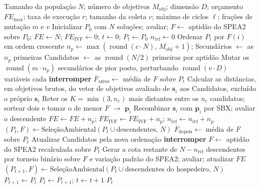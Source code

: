 \begin{algorithm}[!htbp]
\caption[Pseudocódigo do IVF/SPEA2]{IVF/SPEA2 com a mesma quantidade de avaliações das funções objetivo que o hospedeiro}
\label{alg:ivf_spea2}
\small
\begin{algorithmic}[1]
\Require Tamanho da população $N$; número de objetivos $M_{\text{obj}}$; dimensão $D$; orçamento $FE_{\max}$; taxa de execução $r$; tamanho da coleta $c$; máximo de ciclos $\ell$; frações de mutação $m$ e $v$
\State Inicializar $P_0$ com $N$ soluções; avaliar; $F \gets$ aptidão do SPEA2 sobre $P_0$; $FE \gets N$; $FE_{\text{IVF}} \gets 0$; $t \gets 0$; $P_t \gets P_0$
  \State $n_{\text{ivf}} \gets 0$
   
    \State Ordenar $P_t$ por $F(i)$ em ordem crescente 
    \State $n_p \gets \max(\operatorname{round}(c \cdot N),\, M_{\text{obj}} + 1)$; Secundários $\gets$ as $n_p$ primeiras
    \State Candidatos $\gets$ as $\operatorname{round}(N/2)$ primeiras por aptidão 
    \State Mutar os $\operatorname{round}(m \cdot n_p)$ secundários de pior posto, perturbando $\operatorname{round}(v \cdot D)$ variáveis cada 
       \textbf{interromper} 
      \EndIf
      \State $\overline{F}_{\text{antes}} \gets$ média de $F$ sobre $P_t$
        \State Calcular as distâncias, em objetivos brutos, do vetor de objetivos avaliado de $\mathbf{s}_i$ aos Candidatos, excluído o próprio $\mathbf{s}_i$
        \State Reter os $K = \min(3, n_c)$ mais distantes entre os $n_c$ candidatos; sortear dois e tomar o de menor $F$ $\to$ $\mathbf{p}_i$
        \State Recombinar $\mathbf{s}_i$ com $\mathbf{p}_i$ por SBX; avaliar o descendente
      \EndFor
      \State $FE \gets FE + n_p$; $FE_{\text{IVF}} \gets FE_{\text{IVF}} + n_p$; $n_{\text{ivf}} \gets n_{\text{ivf}} + n_p$
      \State $(P_t, F) \gets \textrm{SeleçãoAmbiental}(P_t \cup \text{descendentes},\, N)$ 
      \State $\overline{F}_{\text{depois}} \gets$ média de $F$ sobre $P_t$
       
        \State Atualizar Candidatos pela nova ordenação
      \Else
        \State \textbf{interromper} 
      \EndIf
    \EndFor
  \EndIf
  \State $F \gets$ aptidão do SPEA2 recalculada sobre $P_t$
    \State Gerar a cota restante de $N - n_{\text{ivf}}$ descendentes por torneio binário sobre $F$ e variação padrão do SPEA2; avaliar; atualizar $FE$
    \State $(P_{t+1}, F) \gets \textrm{SeleçãoAmbiental}(P_t \cup \text{descendentes do hospedeiro},\, N)$
  \Else
    \State $P_{t+1} \gets P_t$
  \EndIf
  \State $P_t \gets P_{t+1}$; $t \gets t + 1$
\EndWhile
\State \Return $P_t$
\end{algorithmic}
\end{algorithm}

